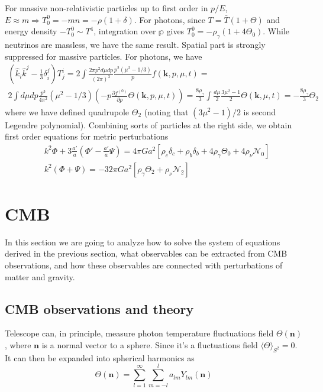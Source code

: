 \documentclass[12pt]{extarticle}
\numberwithin{problem}{section}
\numberwithin{theorem}{section}
\begin{document}
	For massive non-relativistic particles up to first order in $p/E$, $E\approx m\Rightarrow T^0_0 = -mn = -\rho(1 + \delta)$. For photons, since $T = \bar{T}(1 + \Theta)$ and energy density $-T^0_0\sim T^4$, integration over $\mathbb{p}$ gives $T^0_0 = -\rho_\gamma(1 + 4\Theta_0)$. While neutrinos are massless, we have the same result. Spatial part is strongly suppressed for massive particles. For photons, we have
	\begin{multline}
		(\hat{k}_i\hat{k}^j - \frac{1}{3}\delta_i^j)T^i_j = 2\int\frac{2\pi p^2 d\mu dp}{(2\pi)^3}\frac{p^2(\mu^2 - 1/3)}{p}f(\mathbf{k}, p, \mu, t) =\\
		2\int d\mu dp\frac{p^3}{4\pi^2}(\mu^2 - 1/3)\left(-p\frac{\partial f^{(0)}}{\partial p}\Theta(\mathbf{k}, p, \mu, t)\right) = \frac{8\rho_\gamma}{3}\int \frac{d\mu}{2} \frac{3\mu^2 - 1}{2}\Theta(\mathbf{k}, \mu, t) = -\frac{8\rho_\gamma}{3}\Theta_2
	\end{multline}
	where we have defined quadrupole $\Theta_2$ (noting that $(3\mu^2 - 1) / 2$ is second Legendre polynomial). Combining sorts of particles at the right side, we obtain first order equations for metric perturbations
	\begin{align}
		& k^2\Phi + 3\frac{a'}{a}\left(\Phi' - \frac{a'}{a}\Psi\right) = 4\pi Ga^2[\rho_c\delta_c + \rho_b\delta_b + 4\rho_\gamma\Theta_0 + 4\rho_\nu\mathcal{N}_0] \\
		& k^2(\Phi + \Psi) = -32\pi Ga^2[\rho_\gamma\Theta_2 + \rho_\nu\mathcal{N}_2]
	\end{align}

	\section{CMB}
	\label{sec:cmb}
	In this section we are going to analyze how to solve the system of equations derived in the previous section, what observables can be extracted from CMB observations, and how these observables are connected with perturbations of matter and gravity.
	
	\subsection{CMB observations and theory}
	\label{subsec:cmb-obs}
	Telescope can, in principle, measure photon temperature fluctuations field $\Theta(\mathbf{n})$, where $\mathbf{n}$ is a normal vector to a sphere. Since it's a fluctuations field $\langle\Theta\rangle_{S^2} = 0$. It can then be expanded into spherical harmonics as 
	\begin{equation}
		\Theta(\mathbf{n}) = \sum_{l=1}^\infty\sum_{m=-l}^l a_{lm}Y_{lm}(\mathbf{n})
	\end{equation}
	
\end{document}

